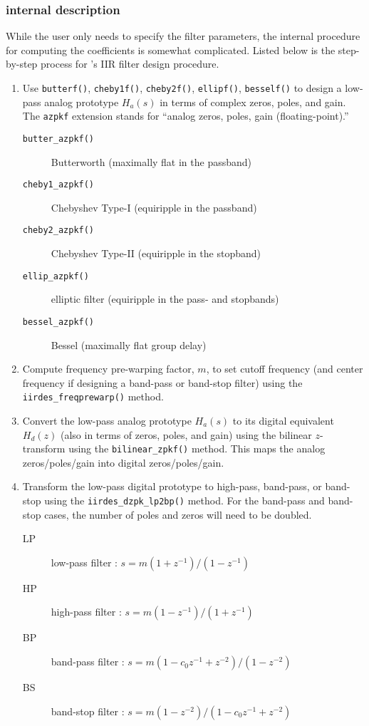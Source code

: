 \subsubsection{internal description}
\label{module:filter:iirdes:internal}
While the user only needs to specify the filter parameters,
the internal procedure for computing the coefficients is somewhat
complicated.
Listed below is the step-by-step process for \liquid's IIR filter design
procedure.
%
\begin{enumerate}
\item Use {\tt butterf()}, {\tt cheby1f()}, {\tt cheby2f()}, {\tt ellipf()},
      {\tt besself()} to design a low-pass analog prototype $H_a(s)$
      in terms of complex zeros, poles, and gain.
      The {\tt azpkf} extension stands for ``analog zeros, poles, gain
      (floating-point).''

    \begin{description}
    \item[{\tt butter\_azpkf()}] Butterworth (maximally flat in the passband)
    \item[{\tt cheby1\_azpkf()}] Chebyshev Type-I (equiripple in the passband)
    \item[{\tt cheby2\_azpkf()}] Chebyshev Type-II (equiripple in the stopband)
    \item[{\tt ellip\_azpkf() }] elliptic filter (equiripple in the pass- and
        stopbands)
    \item[{\tt bessel\_azpkf()}] Bessel (maximally flat group delay)
    \end{description}

\item Compute frequency pre-warping factor, $m$, to set cutoff frequency (and
      center frequency if designing a band-pass or band-stop filter) using the
      {\tt iirdes\_freqprewarp()} method.

\item Convert the low-pass analog prototype $H_a(s)$ to its digital
      equivalent $H_d(z)$ (also in terms of zeros, poles, and gain)
      using the bilinear $z$-transform using the {\tt bilinear\_zpkf()}
      method.
      This maps the analog zeros/poles/gain into digital
      zeros/poles/gain.

\item Transform the low-pass digital prototype to high-pass, band-pass, or
      band-stop using the {\tt iirdes\_dzpk\_lp2bp()} method.
      For the band-pass and band-stop cases, the number of poles and zeros
      will need to be doubled.
    \begin{description}
    \item[LP] low-pass filter   : $s = m (1+z^{-1}) / (1-z^{-1})$
    \item[HP] high-pass filter  : $s = m (1-z^{-1}) / (1+z^{-1})$
    \item[BP] band-pass filter  : $s = m (1-c_0 z^{-1}+z^{-2}) / (1-z^{-2})$
    \item[BS] band-stop filter  : $s = m (1-z^{-2}) / (1-c_0 z^{-1}+z^{-2})$
    \end{description}


\end{enumerate}
